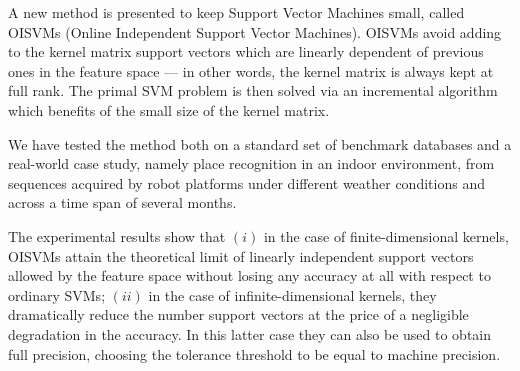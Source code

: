 A new method is presented to keep Support Vector Machines small,
called OISVMs (Online Independent Support Vector Machines). OISVMs
avoid adding to the kernel matrix support vectors which are linearly
dependent of previous ones in the feature space --- in other words,
the kernel matrix is always kept at full rank. The primal SVM problem
is then solved via an incremental algorithm which benefits of the
small size of the kernel matrix.

We have tested the method both on a standard set of benchmark
databases and a real-world case study, namely place recognition in an
indoor environment, from sequences acquired by robot platforms under
different weather conditions and across a time span of several months.

The experimental results show that $(i)$ in the case of
finite-dimensional kernels, OISVMs attain the theoretical limit of
linearly independent support vectors allowed by the feature space
without losing any accuracy at all with respect to ordinary SVMs;
$(ii)$ in the case of infinite-dimensional kernels, they dramatically
reduce the number support vectors at the price of a negligible
degradation in the accuracy. In this latter case they can also be used
to obtain full precision, choosing the tolerance threshold to be equal
to machine precision.
